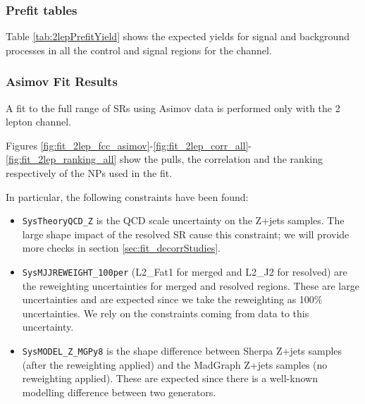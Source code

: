 \subsubsection{Prefit tables}

Table \ref{tab:2lepPrefitYield} shows the expected yields for signal and background processes
in all the control and signal regions for the \tlep channel.



\clearpage

\subsubsection{Asimov Fit Results}
A fit to the full range of SRs using Asimov data is performed only with the 2 lepton channel.

Figures \ref{fig:fit_2lep_fcc_asimov}-\ref{fig:fit_2lep_corr_all}-\ref{fig:fit_2lep_ranking_all}
show the pulls, the correlation and the ranking respectively of the NPs used in the fit.

In particular, the following constraints have been found:
\begin{itemize}
       \item \texttt{SysTheoryQCD\_Z} is the QCD scale uncertainty on the Z+jets samples.
       The large shape impact of the resolved SR cause this constraint;
       we will provide more checks in section \ref{sec:fit_decorrStudies}.

       \item \texttt{SysMJJREWEIGHT\_100per} (L2\_Fat1 for merged and L2\_J2 for resolved)
       are the \mjjtag reweighting uncertainties for merged and resolved regions.
       These are large uncertainties and are expected since we take the \mjjtag reweighting as 100\% uncertainties.
       We rely on the constraints coming from data to this uncertainty.

       \item \texttt{SysMODEL\_Z\_MGPy8}
       is the shape difference between Sherpa Z+jets samples (after the \mjjtag reweighting applied)
       and the MadGraph Z+jets samples (no \mjjtag reweighting applied).
       These are expected since there is a well-known modelling difference between two generators.

\end{itemize}

